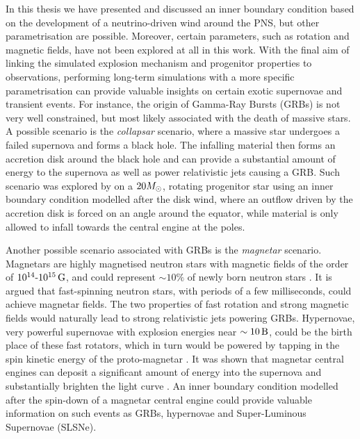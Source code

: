 In this thesis we have presented and discussed an inner boundary condition based on the development of a neutrino-driven wind around the PNS, but other parametrisation are possible. Moreover, certain parameters, such as rotation and magnetic fields, have not been explored at all in this work. With the final aim of linking the simulated explosion mechanism and progenitor properties to observations, performing long-term simulations with a more specific parametrisation can provide valuable insights on certain exotic supernovae and transient events. For instance, the origin of Gamma-Ray Bursts (GRBs) is not very well constrained, but most likely associated with the death of massive stars. A possible scenario is the \emph{collapsar} scenario, where a massive star undergoes a failed supernova and forms a black hole. The infalling material then forms an accretion disk around the black hole and can provide a substantial amount of energy to the supernova as well as power relativistic jets causing a GRB. Such scenario was explored by \cite{Menegazzi2024} on a \(20M_{\odot}\), rotating progenitor star using an inner boundary condition modelled after the disk wind, where an outflow driven by the accretion disk is forced on an angle around the equator, while material is only allowed to infall towards the central engine at the poles.

Another possible scenario associated with GRBs is the \emph{magnetar} scenario. Magnetars are highly magnetised neutron stars with magnetic fields of the order of \(10^{14}\text{-}10^{15}\,\mathrm{G}\), and could represent \(\sim10\%\) of newly born neutron stars \citep{Kouveliotou1998}. It is argued that fast-spinning neutron stars, with periods of a few milliseconds, could achieve magnetar fields. The two properties of fast rotation and strong magnetic fields would naturally lead to strong relativistic jets powering GRBs. Hypernovae, very powerful supernovae with explosion energies near \(\sim10\,\mathrm{B}\), could be the birth place of these fast rotators, which in turn would be powered by tapping in the spin kinetic energy of the proto-magnetar \citep{Burrows2021}. It was shown that magnetar central engines can deposit a significant amount of energy into the supernova and substantially brighten the light curve \citep{Kasen2010}. An inner boundary condition modelled after the spin-down of a magnetar central engine could provide valuable information on such events as GRBs, hypernovae and Super-Luminous Supernovae (SLSNe).
